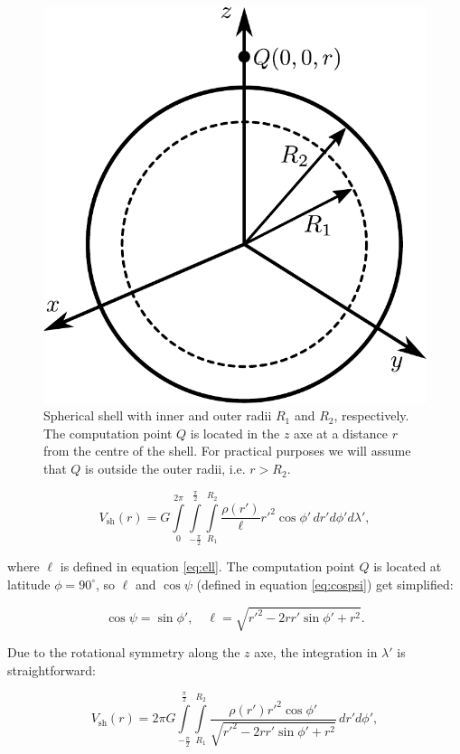 \documentclass[extra]{gji}
\begin{document}
\begin{figure}
\centering
\includegraphics[width=0.7\linewidth]{figures/spherical-shell.pdf}
\caption{
Spherical shell with inner and outer radii $R_1$ and $R_2$, respectively.
The computation point $Q$ is located in the $z$ axe at a distance $r$ from the centre of the shell.
For practical purposes we will assume that $Q$ is outside the outer radii, i.e. $r > R_2$.
}
\label{fig:spherical-shell}
\end{figure}

\begin{equation}
    V_\text{sh}(r) = G 
    \int\limits_0^{2\pi}
    \int\limits_{-\frac{\pi}{2}}^\frac{\pi}{2}
    \int\limits_{R_1}^{R_2}
    \frac{\rho(r')}{\ell} {r'}^2 \cos\phi' \, 
    dr' d\phi' d\lambda',
\end{equation}

\noindent where $\ell$ is defined in equation \ref{eq:ell}.
The computation point $Q$ is located at latitude $\phi=90^\circ$, so $\ell$ and $\cos\psi$ (defined in equation \ref{eq:cospsi}) get simplified:

\begin{equation}
    \cos\psi = \sin\phi', \quad
    \ell = \sqrt{r'^2 - 2 r r' \sin\phi' + r^2}.
\end{equation}

Due to the rotational symmetry along the $z$ axe, the integration in $\lambda'$ is straightforward:

\begin{equation}
    V_\text{sh}(r) = 2\pi G 
    \int\limits_{-\frac{\pi}{2}}^\frac{\pi}{2}
    \int\limits_{R_1}^{R_2}
    \frac{\rho(r') {r'}^2 \cos\phi'}{\sqrt{r'^2 - 2 r r' \sin\phi' + r^2}}
    \, dr' d\phi',
\end{equation}
\end{document}
